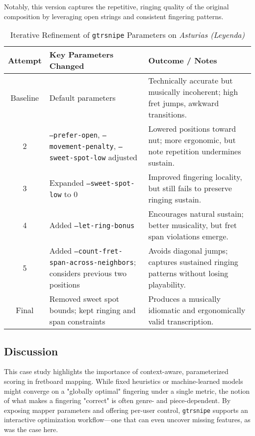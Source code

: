 \documentclass[conference]{IEEEtran}
\begin{document}
Notably, this version captures the repetitive, ringing quality of the original composition by leveraging open strings and consistent fingering patterns.

\begin{table}[htbp]
\caption{Iterative Refinement of \texttt{gtrsnipe} Parameters on \emph{Asturias (Leyenda)}}
\centering
\renewcommand{\arraystretch}{1.2}
\begin{tabular}{|c|p{3.3cm}|p{3.3cm}|}
\hline
\textbf{Attempt} & \textbf{Key Parameters Changed} & \textbf{Outcome / Notes} \\
\hline
Baseline &
Default parameters &
Technically accurate but musically incoherent; high fret jumps, awkward transitions. \\
\hline
2 &
\texttt{--prefer-open}, \texttt{--movement-penalty}, \texttt{--sweet-spot-low} adjusted &
Lowered positions toward nut; more ergonomic, but note repetition undermines sustain. \\
\hline
3 &
Expanded \texttt{--sweet-spot-low} to 0 &
Improved fingering locality, but still fails to preserve ringing sustain. \\
\hline
4 &
Added \texttt{--let-ring-bonus} &
Encourages natural sustain; better musicality, but fret span violations emerge. \\
\hline
5 &
Added \texttt{--count-fret-span-across-neighbors}; considers previous two positions &
Avoids diagonal jumps; captures sustained ringing patterns without losing playability. \\
\hline
Final &
Removed sweet spot bounds; kept ringing and span constraints &
Produces a musically idiomatic and ergonomically valid transcription. \\
\hline
\end{tabular}
\label{tab:leyenda_tuning}
\end{table}


\subsection{Discussion}

This case study highlights the importance of context-aware, parameterized scoring in fretboard mapping. While fixed heuristics or machine-learned models might converge on a "globally optimal" fingering under a single metric, the notion of what makes a fingering "correct" is often genre- and piece-dependent. By exposing mapper parameters and offering per-user control, \texttt{gtrsnipe} supports an interactive optimization workflow—one that can even uncover missing features, as was the case here.
\end{document}
